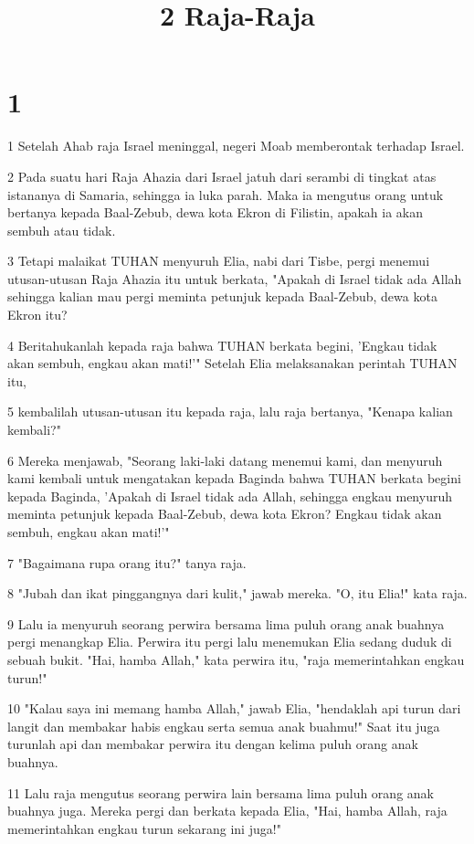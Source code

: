

\title{2 Raja-Raja}


\chapter{1}

\par 1 Setelah Ahab raja Israel meninggal, negeri Moab memberontak terhadap Israel.
\par 2 Pada suatu hari Raja Ahazia dari Israel jatuh dari serambi di tingkat atas istananya di Samaria, sehingga ia luka parah. Maka ia mengutus orang untuk bertanya kepada Baal-Zebub, dewa kota Ekron di Filistin, apakah ia akan sembuh atau tidak.
\par 3 Tetapi malaikat TUHAN menyuruh Elia, nabi dari Tisbe, pergi menemui utusan-utusan Raja Ahazia itu untuk berkata, "Apakah di Israel tidak ada Allah sehingga kalian mau pergi meminta petunjuk kepada Baal-Zebub, dewa kota Ekron itu?
\par 4 Beritahukanlah kepada raja bahwa TUHAN berkata begini, 'Engkau tidak akan sembuh, engkau akan mati!'" Setelah Elia melaksanakan perintah TUHAN itu,
\par 5 kembalilah utusan-utusan itu kepada raja, lalu raja bertanya, "Kenapa kalian kembali?"
\par 6 Mereka menjawab, "Seorang laki-laki datang menemui kami, dan menyuruh kami kembali untuk mengatakan kepada Baginda bahwa TUHAN berkata begini kepada Baginda, 'Apakah di Israel tidak ada Allah, sehingga engkau menyuruh meminta petunjuk kepada Baal-Zebub, dewa kota Ekron? Engkau tidak akan sembuh, engkau akan mati!'"
\par 7 "Bagaimana rupa orang itu?" tanya raja.
\par 8 "Jubah dan ikat pinggangnya dari kulit," jawab mereka. "O, itu Elia!" kata raja.
\par 9 Lalu ia menyuruh seorang perwira bersama lima puluh orang anak buahnya pergi menangkap Elia. Perwira itu pergi lalu menemukan Elia sedang duduk di sebuah bukit. "Hai, hamba Allah," kata perwira itu, "raja memerintahkan engkau turun!"
\par 10 "Kalau saya ini memang hamba Allah," jawab Elia, "hendaklah api turun dari langit dan membakar habis engkau serta semua anak buahmu!" Saat itu juga turunlah api dan membakar perwira itu dengan kelima puluh orang anak buahnya.
\par 11 Lalu raja mengutus seorang perwira lain bersama lima puluh orang anak buahnya juga. Mereka pergi dan berkata kepada Elia, "Hai, hamba Allah, raja memerintahkan engkau turun sekarang ini juga!"
